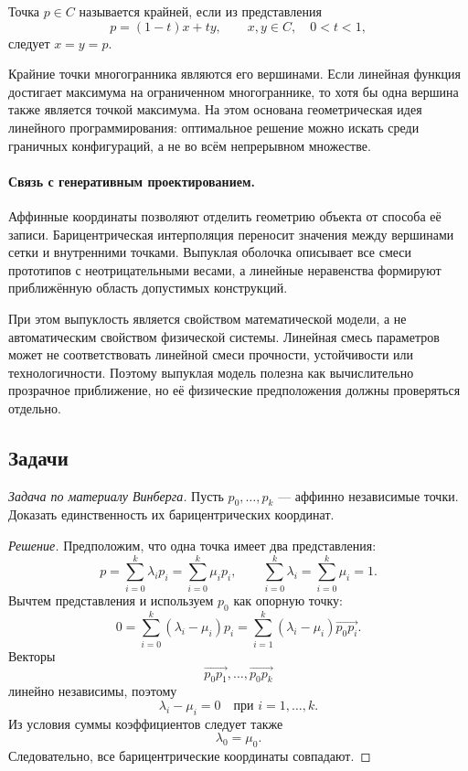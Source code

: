 \begin{definition}
Точка \(p\in C\) называется крайней, если из представления
\[
p=(1-t)x+ty,
\qquad
x,y\in C,\quad 0<t<1,
\]
следует \(x=y=p\).
\end{definition}

Крайние точки многогранника являются его вершинами. Если линейная функция достигает максимума на ограниченном многограннике, то хотя бы одна вершина также является точкой максимума. На этом основана геометрическая идея линейного программирования: оптимальное решение можно искать среди граничных конфигураций, а не во всём непрерывном множестве.

\paragraph{Связь с генеративным проектированием.}

Аффинные координаты позволяют отделить геометрию объекта от способа её записи. Барицентрическая интерполяция переносит значения между вершинами сетки и внутренними точками. Выпуклая оболочка описывает все смеси прототипов с неотрицательными весами, а линейные неравенства формируют приближённую область допустимых конструкций.

При этом выпуклость является свойством математической модели, а не автоматическим свойством физической системы. Линейная смесь параметров может не соответствовать линейной смеси прочности, устойчивости или технологичности. Поэтому выпуклая модель полезна как вычислительно прозрачное приближение, но её физические предположения должны проверяться отдельно.

\subsection*{Задачи}

\begin{problem}
\textit{Задача по материалу Винберга.}
Пусть \(p_0,\dots,p_k\) --- аффинно независимые точки. Доказать единственность их барицентрических координат.
\end{problem}

\begin{proof}[Решение]
Предположим, что одна точка имеет два представления:
\[
p=\sum_{i=0}^{k}\lambda_ip_i
=
\sum_{i=0}^{k}\mu_ip_i,
\qquad
\sum_{i=0}^{k}\lambda_i
=
\sum_{i=0}^{k}\mu_i
=1.
\]
Вычтем представления и используем \(p_0\) как опорную точку:
\[
0
=
\sum_{i=0}^{k}(\lambda_i-\mu_i)p_i
=
\sum_{i=1}^{k}(\lambda_i-\mu_i)
\overrightarrow{p_0p_i}.
\]
Векторы
\[
\overrightarrow{p_0p_1},\dots,\overrightarrow{p_0p_k}
\]
линейно независимы, поэтому
\[
\lambda_i-\mu_i=0
\quad
\text{при }i=1,\dots,k.
\]
Из условия суммы коэффициентов следует также
\[
\lambda_0=\mu_0.
\]
Следовательно, все барицентрические координаты совпадают.
\end{proof}

